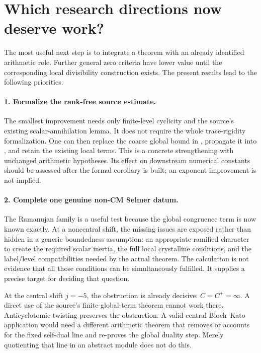 \section{Which research directions now deserve work?}
\label{sec:program}

The most useful next step is to integrate a theorem with an already
identified arithmetic role. Further general zero criteria have lower
value until the corresponding local divisibility construction exists.
The present results lead to the following priorities.

\paragraph{1. Formalize the rank-free source estimate.}
The smallest improvement needs only finite-level cyclicity and the
source's existing scalar-annihilation lemma. It does not require the
whole trace-rigidity formalization. One can then replace the coarse
global bound in , propagate it into
, and retain the existing local terms.
This is a concrete strengthening with unchanged arithmetic hypotheses.
Its effect on downstream numerical constants should be assessed after
the formal corollary is built; an exponent improvement is not implied.

\paragraph{2. Complete one genuine non-CM Selmer datum.}
The Ramanujan family is a useful test because the global congruence
term is now known exactly. At a noncentral shift, the missing issues
are exposed rather than hidden in a generic boundedness assumption:
an appropriate ramified character to create the required scalar
inertia, the full local crystalline conditions, and the label/level
compatibilities needed by the actual theorem.
The calculation is not evidence that all those conditions can be
simultaneously fulfilled. It supplies a precise target for deciding
that question.

At the central shift \(j=-5\), the obstruction is already decisive:
\(C=C^+=\infty\). A direct use of the source's finite-global-term
theorem cannot work there. Anticyclotomic twisting preserves the
obstruction. A valid central Bloch--Kato application would need a
different arithmetic theorem that removes or accounts for the fixed
self-dual line and re-proves the global duality step. Merely quotienting
that line in an abstract module does not do this.\cite{priorstruct}


